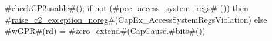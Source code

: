 #\hyperref[sailMIPSzcheckCP2usable]{checkCP2usable}#();
if not (#\hyperref[sailMIPSzpcczyaccesszysystemzyregs]{pcc\_access\_system\_regs}# ()) then
  #\hyperref[sailMIPSzraisezyc2zyexceptionzynoreg]{raise\_c2\_exception\_noreg}#(CapEx_AccessSystemRegsViolation)
else
  #\hyperref[sailMIPSzwGPR]{wGPR}#(rd) = #\hyperref[sailMIPSzzzerozyextend]{zero\_extend}#(CapCause.#\hyperref[sailMIPSzbits]{bits}#())
